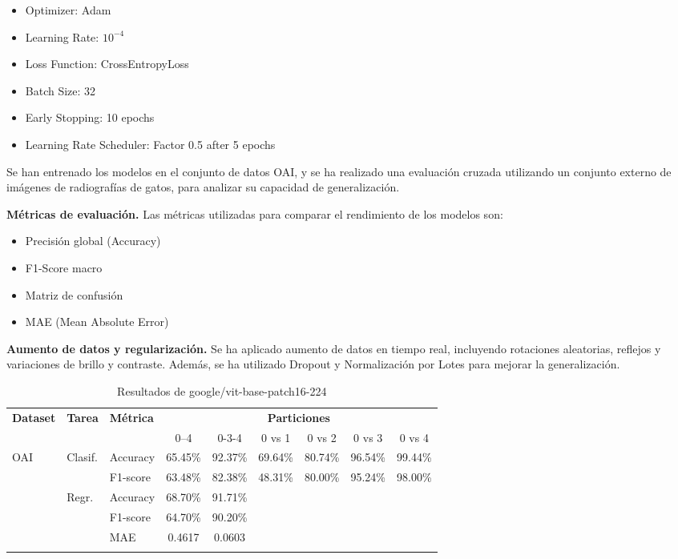 \documentclass[11pt,spanish,listoffigures,listoftables]{tfgetsinf}
\begin{document}
\begin{itemize}
\item Optimizer: Adam
\item Learning Rate: $10^{-4}$
\item Loss Function: CrossEntropyLoss
\item Batch Size: 32
\item Early Stopping: 10 epochs
\item Learning Rate Scheduler: Factor 0.5 after 5 epochs
\end{itemize}

Se han entrenado los modelos en el conjunto de datos OAI, y se ha realizado una evaluación cruzada utilizando un conjunto externo de imágenes de radiografías de gatos, 
para analizar su capacidad de generalización.

\textbf{Métricas de evaluación.}
Las métricas utilizadas para comparar el rendimiento de los modelos son:

\begin{itemize}
\item Precisión global (Accuracy)
\item F1-Score macro
\item Matriz de confusión
\item MAE (Mean Absolute Error)
\end{itemize}

\textbf{Aumento de datos y regularización.}
Se ha aplicado aumento de datos en tiempo real, incluyendo rotaciones aleatorias, reflejos y variaciones de brillo y contraste. Además, se ha utilizado Dropout y 
Normalización por Lotes para mejorar la generalización.

\begin{table}[h]
    \centering
    \caption{Resultados de google/vit-base-patch16-224}
    \label{tab:cnn_grande_results}
    \begin{tabular}{@{} l l l c c c c c c @{}} 
      \toprule
      \textbf{Dataset} & \textbf{Tarea} & \textbf{Métrica} 
        & \multicolumn{6}{c}{\textbf{Particiones}} \\
      \cmidrule(lr){4-9}
      & & & 0--4 & 0-3-4 & 0 vs 1 & 0 vs 2 & 0 vs 3 & 0 vs 4 \\
      \midrule
      \multirow{2}{*}{OAI}
        & Clasif. & Accuracy   & 65.45\%   & 92.37\%  & 69.64\% & 80.74\% & 96.54\% & 99.44\% \\
        &         & F1-score   & 63.48\%   & 82.38\%  & 48.31\% & 80.00\% & 95.24\% & 98.00\% \\
      \addlinespace
      \multirow{3}{*}{OAI}
        & Regr.   & Accuracy   & 68.70\%   & 91.71\%   &  &  &  &  \\
        &         & F1-score   & 64.70\%   & 90.20\%   &  &  &  &  \\
        &         & MAE        & 0.4617    & 0.0603    &  &  &  &  \\
      \addlinespace
    \end{tabular}
\end{table}
\end{document}
